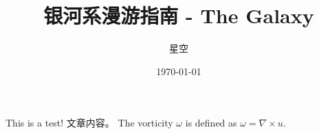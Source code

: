 \documentclass[11pt, letterpaper]{article}
\title{银河系漫游指南 - The Galaxy}
\author{星空}
\date{\today}
\begin{document}
\maketitle
    This is a test!  文章内容。
    The vorticity $ω$ is defined as $ω = ∇ × u$.
\end{document}
